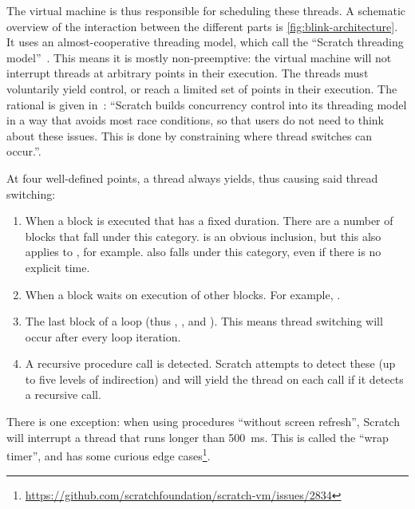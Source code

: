 \documentclass[../main]{subfiles}
\begin{document}
The virtual machine is thus responsible for scheduling these threads.
A schematic overview of the interaction between the different parts is \cref{fig:blink-architecture}.
It uses an almost-cooperative threading model, which \citeauthor{maloneyScratchProgrammingLanguage2010a} call the ``Scratch threading model''~\autocite{maloneyScratchProgrammingLanguage2010a}.
This means it is mostly non-preemptive: the virtual machine will not interrupt threads at arbitrary points in their execution.
The threads must voluntarily yield control, or reach a limited set of points in their execution.
The rational is given in~\autocite{maloneyScratchProgrammingLanguage2010a}: ``Scratch builds concurrency control into its threading model in a way that avoids most race conditions, so that users do not need to think about these issues.
This is done by constraining where thread switches can occur.''.

At four well-defined points, a thread always yields, thus causing said thread switching:
\begin{enumerate}
    \item When a block is executed that has a fixed duration.
        There are a number of blocks that fall under this category.
         is an obvious inclusion, but this also applies to , for example.
         also falls under this category, even if there is no explicit time.
    \item When a block waits on execution of other blocks.
        For example, .
    \item The last block of a loop (thus , , and ).
        This means thread switching will occur after every loop iteration.
    \item A recursive procedure call is detected.
        Scratch attempts to detect these (up to five levels of indirection) and will yield the thread on each call if it detects a recursive call.
\end{enumerate}

There is one exception: when using procedures ``without screen refresh'', Scratch will interrupt a thread that runs longer than \qty{500}{\milli\second}.
This is called the ``wrap timer'', and has some curious edge cases\footnote{\url{https://github.com/scratchfoundation/scratch-vm/issues/2834}}.
\end{document}
